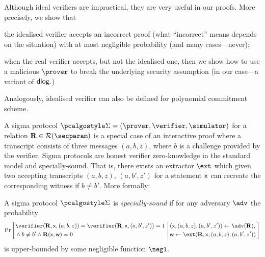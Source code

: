 Although ideal verifiers are impractical, they are very useful in our
proofs. More precisely, we show that
\begin{compactenum}
\item the idealised verifier accepts an incorrect proof (what ``incorrect''
  means depends on the situation) with at most negligible probability (and many
  cases---never);
\item when the real verifier accepts, but not the idealised one, then we show
  how to use a malicious $\prover$ to break the underlying security assumption
  (in our case---a variant of $\mathsf{dlog}$.)
\end{compactenum}

Analogously, idealised verifier can also be defined for polynomial commitment scheme.

A sigma protocol $\sigmaprot = (\prover, \verifier, \simulator)$ for a relation
$\REL \in \RELGEN(\secparam)$ is a special case of an interactive proof where a
transcript consists of three messages $(a, b, z)$, where $b$ is a challenge
provided by the verifier. Sigma protocols are honest verifier zero-knowledge in
the standard model and specially-sound. That is, there exists an extractor
$\ext$ which given two accepting transcripts $(a, b, z)$, $(a, b', z')$ for a
statement $\mathsf{x}$ can recreate the corresponding witness if $b \neq b'$.
More formally:

A sigma protocol $\sigmaprot$ is \emph{specially-sound}
  if for any adversary $\adv$ the probability
\[
\Pr\left[
\begin{aligned}
& \verifier(\REL, \inp, (a, b, z)) = %
\verifier(\REL, \inp, (a, b', z')) = 1 \\
& \land b \neq b' \land \REL(\inp, \wit) = 0 \\
\end{aligned}
\,\left|\,
\begin{aligned}
& (\inp, (a, b, z), (a, b', z')) \gets \adv(\REL), \\ %
& \wit \gets \ext(\REL, \inp, (a, b, z), (a, b', z'))\\
\end{aligned}
\right.\right]
\]
is upper-bounded by some negligible function $\negl$.

